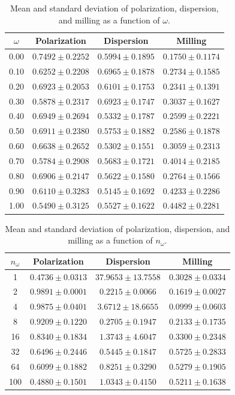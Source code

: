 
\begin{table}[ht]
\centering
\caption{Mean and standard deviation of polarization, dispersion, and milling as a function of $\omega$.}
\label{tab:omega_stats}
\begin{tabular}{c c c c}
\hline
$\omega$ &
Polarization &
Dispersion &
Milling \\
\hline
0.00 & $0.7492 \pm 0.2252$ & $0.5994 \pm 0.1895$ & $0.1750 \pm 0.1174$ \\
0.10 & $0.6252 \pm 0.2208$ & $0.6965 \pm 0.1878$ & $0.2734 \pm 0.1585$ \\
0.20 & $0.6923 \pm 0.2053$ & $0.6101 \pm 0.1753$ & $0.2341 \pm 0.1391$ \\
0.30 & $0.5878 \pm 0.2317$ & $0.6923 \pm 0.1747$ & $0.3037 \pm 0.1627$ \\
0.40 & $0.6949 \pm 0.2694$ & $0.5332 \pm 0.1787$ & $0.2599 \pm 0.2221$ \\
0.50 & $0.6911 \pm 0.2380$ & $0.5753 \pm 0.1882$ & $0.2586 \pm 0.1878$ \\
0.60 & $0.6638 \pm 0.2652$ & $0.5302 \pm 0.1551$ & $0.3059 \pm 0.2313$ \\
0.70 & $0.5784 \pm 0.2908$ & $0.5683 \pm 0.1721$ & $0.4014 \pm 0.2185$ \\
0.80 & $0.6906 \pm 0.2147$ & $0.5622 \pm 0.1580$ & $0.2764 \pm 0.1566$ \\
0.90 & $0.6110 \pm 0.3283$ & $0.5145 \pm 0.1692$ & $0.4233 \pm 0.2286$ \\
1.00 & $0.5490 \pm 0.3125$ & $0.5527 \pm 0.1622$ & $0.4482 \pm 0.2281$ \\
\hline
\end{tabular}
\end{table}


\begin{table}[ht]
\centering
\caption{Mean and standard deviation of polarization, dispersion, and milling as a function of $n_\omega$.}
\label{tab:nomega_stats}
\begin{tabular}{c c c c}
\hline
$n_\omega$ &
Polarization &
Dispersion &
Milling \\
\hline
1   & $0.4736 \pm 0.0313$ & $37.9653 \pm 13.7558$ & $0.3028 \pm 0.0334$ \\
2   & $0.9891 \pm 0.0001$ & $0.2215 \pm 0.0066$  & $0.1619 \pm 0.0027$ \\
4   & $0.9875 \pm 0.0401$ & $3.6712 \pm 18.6655$ & $0.0999 \pm 0.0603$ \\
8   & $0.9209 \pm 0.1220$ & $0.2705 \pm 0.1947$  & $0.2133 \pm 0.1735$ \\
16  & $0.8340 \pm 0.1834$ & $1.3743 \pm 4.6047$  & $0.3300 \pm 0.2348$ \\
32  & $0.6496 \pm 0.2446$ & $0.5445 \pm 0.1847$  & $0.5725 \pm 0.2833$ \\
64  & $0.6099 \pm 0.1882$ & $0.8251 \pm 0.3290$  & $0.5279 \pm 0.1905$ \\
100 & $0.4880 \pm 0.1501$ & $1.0343 \pm 0.4150$  & $0.5211 \pm 0.1638$ \\
\hline
\end{tabular}
\end{table}


